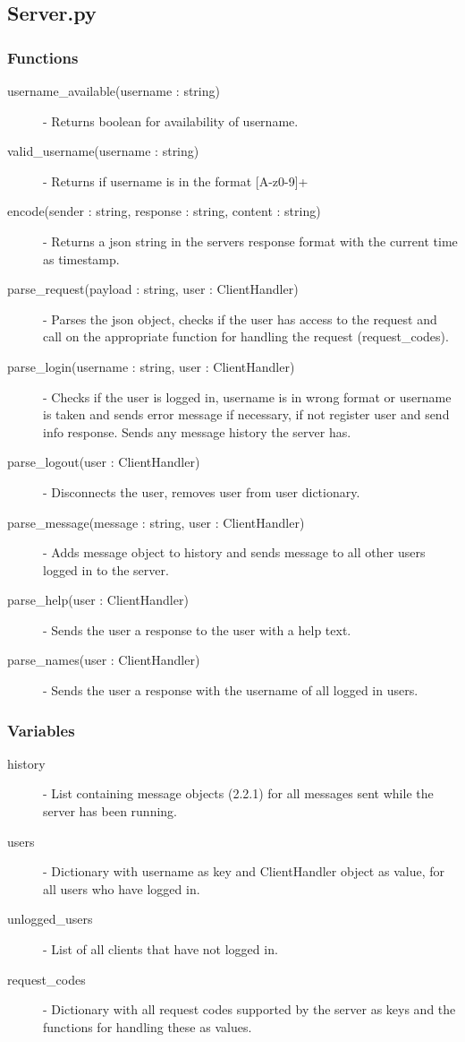 \documentclass[a4paper, 12pt]{article}
\begin{document}
    \subsection{Server.py}
        \subsubsection{Functions}
            \begin{description}
                \item[username\_available(username : string)] - Returns boolean for availability of username.
                \item[valid\_username(username : string)] - Returns if username is in the format [A-z0-9]+
                \item[encode(sender : string, response : string, content : string)] - Returns a json string in the servers response format with the current time as timestamp.
                \item[parse\_request(payload : string, user : ClientHandler)] - Parses the json object, checks if the user has access to the request and call on the appropriate function for handling the request (request\_codes).
                \item[parse\_login(username : string, user : ClientHandler)] - Checks if the user is logged in, username is in wrong format or username is taken and sends error message if necessary, if not register user and send info response. Sends any message history the server has.
                \item[parse\_logout(user : ClientHandler)] - Disconnects the user, removes user from user dictionary.
                \item[parse\_message(message : string, user : ClientHandler)] - Adds message object to history and sends message to all other users logged in to the server.
                \item[parse\_help(user : ClientHandler)] - Sends the user a response to the user with a help text.
                \item[parse\_names(user : ClientHandler)] - Sends the user a response with the username of all logged in users.
            \end{description}
        \subsubsection{Variables}
            \begin{description}
                \item[history] - List containing message objects (2.2.1) for all messages sent while the server has been running.
                \item[users] - Dictionary with username as key and ClientHandler object as value, for all users who have logged in.
                \item[unlogged\_users] - List of all clients that have not logged in.
                \item[request\_codes] - Dictionary with all request codes supported by the server as keys and the functions for handling these as values.
            \end{description}
\end{document}
